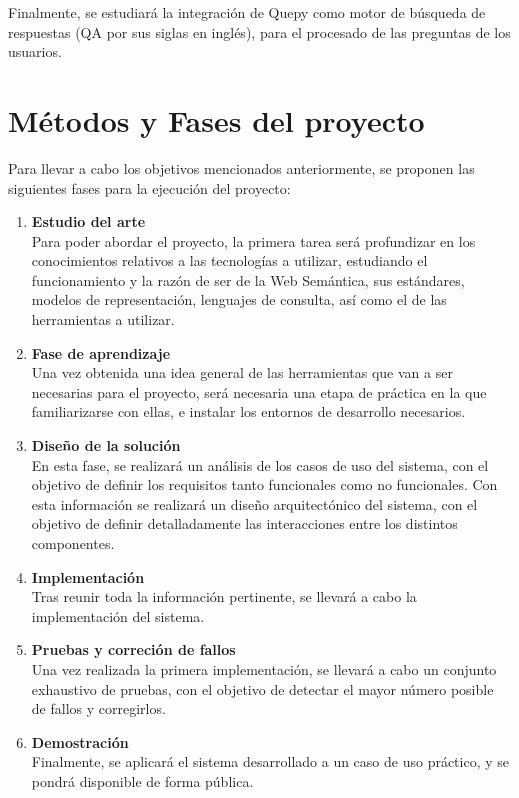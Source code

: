 \documentclass[a4paper,11pt]{report}
\begin{document}
Finalmente, se estudiará la integración de Quepy como motor de búsqueda de respuestas (QA por sus siglas en inglés), para el procesado de las preguntas de los usuarios.

\chapter*{Métodos y Fases del proyecto}\vspace{-1ex}

Para llevar a cabo los objetivos mencionados anteriormente, se proponen las siguientes fases para la ejecución del proyecto:
\begin{enumerate}
  \item \textbf{Estudio del arte } ~\\
  Para poder abordar el proyecto, la primera tarea será profundizar en los conocimientos relativos a las tecnologías a utilizar, estudiando el funcionamiento y la razón de ser de la Web Semántica, sus estándares, modelos de representación, lenguajes de consulta, así como el de las herramientas a utilizar.
  \item \textbf{Fase de aprendizaje} ~\\
  Una vez obtenida una idea general de las herramientas que van a ser necesarias para el proyecto, será necesaria una etapa de práctica en la que familiarizarse con ellas, e instalar los entornos de desarrollo necesarios.
  \item \textbf{Diseño de la solución} ~\\ 
  En esta fase, se realizará un análisis de los casos de uso del sistema, con el objetivo de definir los requisitos tanto funcionales como no funcionales. Con esta información se realizará un diseño arquitectónico del sistema, con el objetivo de definir detalladamente las interacciones entre los distintos componentes.
  \item \textbf{Implementación} ~\\
  Tras reunir toda la información pertinente, se llevará a cabo la implementación del sistema.
  \item \textbf{Pruebas y correción de fallos} ~\\
  Una vez realizada la primera implementación, se llevará a cabo un conjunto exhaustivo de pruebas, con el objetivo de detectar el mayor número posible de fallos y corregirlos.
  \item \textbf{Demostración } ~\\
  Finalmente, se aplicará el sistema desarrollado a un caso de uso práctico, y se pondrá disponible de forma pública.
\end{enumerate}
\end{document}
